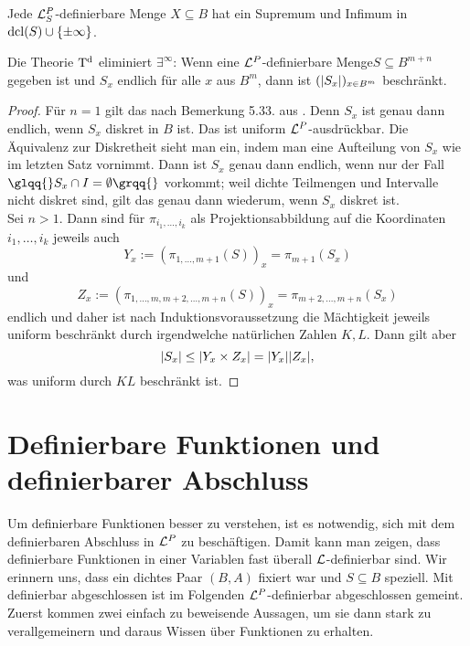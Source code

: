 \begin{corollary}
	Jede $\mathcal{L}^P_S$-definierbare Menge $X\subseteq B$ hat ein Supremum und Infimum in $\operatorname{dcl}(S)\cup\{\pm\infty\}$.
\end{corollary}

\begin{lemma}
	Die Theorie $\operatorname{T^d}$ eliminiert $\exists^\infty$: Wenn eine $\mathcal{L}^P$-definierbare Menge\linebreak $S\subseteq B^{m+n}$ gegeben ist und $S_x$ endlich für alle $x$ aus $B^m$, dann ist $({\left| S_x \right|})_{x\in B^m}$ beschränkt.
\end{lemma}
\begin{proof}
	Für $n=1$ gilt das nach Bemerkung 5.33. aus \cite{Lukas}. Denn $S_x$ ist genau dann endlich, wenn $S_x$ diskret in $B$ ist. Das ist uniform $\mathcal{L}^P$-ausdrückbar. Die Äquivalenz zur Diskretheit sieht man ein, indem man eine Aufteilung von $S_x$ wie im letzten Satz vornimmt. Dann ist $S_x$ genau dann endlich, wenn nur der Fall $\glqq{}S_x\cap I=\emptyset\grqq{}$ vorkommt; weil dichte Teilmengen und Intervalle nicht diskret sind, gilt das genau dann wiederum, wenn $S_x$ diskret ist.\\
	Sei $n>1$. Dann sind für $\pi_{i_1,\dots,i_k}$ als Projektionsabbildung auf die Koordinaten $i_1,\dots,i_k$ jeweils auch $$Y_x:=(\pi_{1,\dots,m+1}(S))_x=\pi_{m+1}(S_x)$$ und $$Z_x:=(\pi_{1,\dots,m,m+2,\dots,m+n}(S))_x=\pi_{m+2,\dots,m+n}(S_x)$$ endlich und daher ist nach Induktionsvoraussetzung die Mächtigkeit jeweils uniform beschränkt durch irgendwelche natürlichen Zahlen $K,L$. Dann gilt aber $${\left| S_x \right|}\leq {\left| Y_x\times Z_x \right|}={\left| Y_x \right|}{\left| Z_x \right|},$$ was uniform durch $KL$ beschränkt ist.
\end{proof}
\newpage
\section{Definierbare Funktionen und definierbarer Abschluss}
Um definierbare Funktionen besser zu verstehen, ist es notwendig, sich mit dem definierbaren Abschluss in $\mathcal{L}^P$ zu beschäftigen. Damit kann man zeigen, dass definierbare Funktionen in einer Variablen \glqq{}fast überall\grqq{} $\mathcal{L}$-definierbar sind. Wir erinnern uns, dass ein dichtes Paar $(B,A)$ fixiert war und $S\subseteq B$ speziell. Mit \glqq{}definierbar abgeschlossen\grqq{} ist im Folgenden \glqq{}$\mathcal{L}^P$-definierbar abgeschlossen\grqq{} gemeint. Zuerst kommen zwei einfach zu beweisende Aussagen, um sie dann stark zu verallgemeinern und daraus Wissen über Funktionen zu erhalten.

